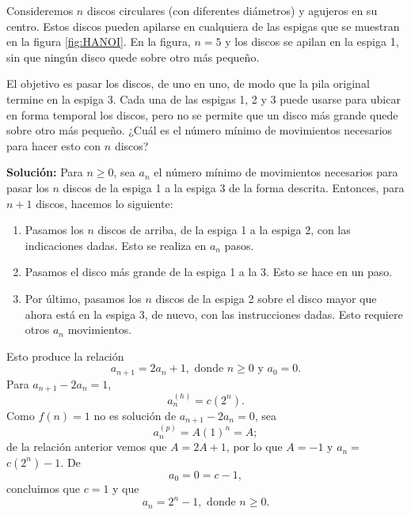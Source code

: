 \begin{myexample}
    Consideremos $n$ discos circulares (con diferentes diámetros) y agujeros en su centro. Estos discos pueden apilarse en cualquiera de las espigas que se muestran en la figura \ref{fig:HANOI}. En la figura, $n = 5$ y los discos se apilan en la espiga 1, sin que ningún disco quede sobre otro más pequeño.
    \begin{center}
         \label{fig:HANOI}
    \end{center}
    El objetivo es pasar los discos, de uno en uno, de modo que la pila original termine en la espiga 3. Cada una de las espigas 1, 2 y 3 puede usarse para ubicar en forma temporal los discos, pero no se permite que un disco más grande quede sobre otro más pequeño. ¿Cuál es el número mínimo de movimientos necesarios para hacer esto con $n$ discos?

    \tcblower
    \textbf{\color{jblueleft}Solución:} Para $n \geq 0$, sea $a_n$ el número mínimo de movimientos necesarios para pasar los $n$ discos de la espiga 1 a la espiga 3 de la forma descrita. Entonces, para $n + 1$ discos, hacemos lo siguiente:
    \begin{enumerate}[label=\alph*)]
        \item Pasamos los $n$ discos de arriba, de la espiga 1 a la espiga 2, con las indicaciones dadas. Esto se realiza en $a_n$ pasos.
        \item Pasamos el disco más grande de la espiga 1 a la 3. Esto se hace en un paso.
        \item Por último, pasamos los $n$ discos de la espiga 2 sobre el disco mayor que ahora está en la espiga 3, de nuevo, con las instrucciones dadas. Esto requiere otros $a_n$ movimientos.
    \end{enumerate}
    Esto produce la relación
    $$a_{n+1}=2 a_n+1, \text{ donde } n \geq 0 \text{ y } a_0=0.$$
    Para $a_{n+1}-2 a_n=1$,
    $$a_n^{(h)}=c\left(2^n\right).$$
    Como $f(n)=1$ no es solución de $a_{n+1}-2 a_n=0$, sea
    $$a_n^{(p)}=A(1)^n=A;$$
    de la relación anterior vemos que $A=2 A+1$, por lo que $A=-1$ y $a_n=$ $c\left(2^n\right)-1$. De
    $$a_0 = 0 = c - 1,$$
    concluimos que $c=1$ y que
    $$a_n=2^n-1, \text{ donde } n \geq 0.$$
\end{myexample}


